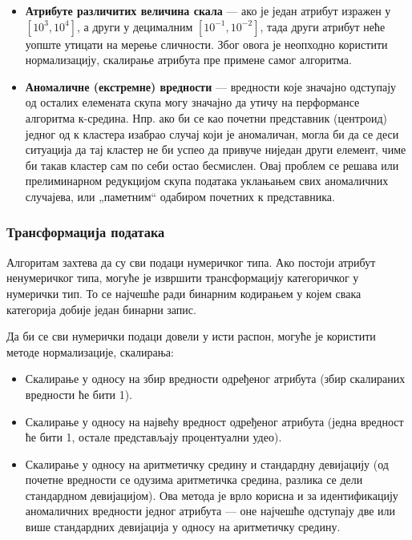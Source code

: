 \begin{itemize}
  \item \textbf{Атрибуте различитих величина скала} — ако је један атрибут изражен у $[10^3, 10^4]$, а други у децималним $[10^{-1}, 10^{-2}]$, тада други атрибут неће уопште утицати на мерење сличности. Због овога је неопходно користити нормализацију, скалирање атрибута пре примене самог алгоритма.
  \item \textbf{Аномаличне (екстремне) вредности} — вредности које значајно одступају од осталих елемената скупа могу значајно да утичу на перформансе алгоритма к-средина. Нпр. ако би се као почетни представник (центроид) једног од к кластера изабрао случај који је аномаличан, могла би да се деси ситуација да тај кластер не би успео да привуче ниједан други елемент, чиме би такав кластер сам по себи остао бесмислен. Овај проблем се решава или прелиминарном редукцијом скупа података уклањањем свих аномаличних случајева, или „паметним“ одабиром почетних к представника.
\end{itemize}

\subsubsection{Трансформација података}
Алгоритам захтева да су сви подаци нумеричког типа. Ако постоји атрибут ненумеричког типа, могуће је извршити трансформацију категоричког у нумерички тип. То се најчешће ради бинарним кодирањем у којем свака категорија добије један бинарни запис.

Да би се сви нумерички подаци довели у исти распон, могуће је користити методе нормализације, скалирања:

\begin{itemize}
  \item Скалирање у односу на збир вредности одређеног атрибута (збир скалираних вредности ће бити 1).
  \item Скалирање у односу на највећу вредност одређеног атрибута (једна вредност ће бити 1, остале представљају процентуални удео).
  \item Скалирање у односу на аритметичку средину и стандардну девијацију (од почетне вредности се одузима аритметичка средина, разлика се дели стандардном девијацијом). Ова метода је врло корисна и за идентификацију аномаличних вредности једног атрибута — оне најчешће одступају две или више стандардних девијација у односу на аритметичку средину.
\end{itemize}

